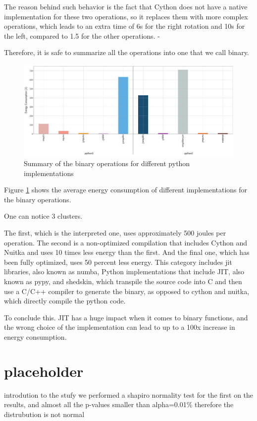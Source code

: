 The reason behind such behavior is the fact that Cython does not have a native implementation for these two operations, so it replaces them with more complex operations, which leads to an extra time of 6s for the right rotation and 10s for the left, compared to 1.5 for the other operations. -

Therefore, it is safe to summarize all the operations into one that we call binary.

\begin{figure}
    \centering
    \includegraphics[width=\linewidth]{imgs/bitopts_mean}
    \caption{Summary of the binary operations for different python implementations }
    \label{figure:bitops}
\end{figure}
Figure \ref{figure:bitops}  shows the average energy consumption of different implementations for the binary operations.

One can notice 3 clusters.

The first, which is the interpreted one, uses approximately 500 joules per operation. The second is a non-optimized compilation that includes Cython and Nuitka and uses 10 times less energy than the first. And the final one, which has been fully optimized, uses 50 percent less energy. This category includes jit libraries, also known as numba, Python implementations that include JIT, also known as pypy, and shedskin, which transpile the source code into C and then use a C/C++ compiler to generate the binary, as opposed to cython and nuitka, which directly compile the python code.




To conclude this. JIT has a huge impact when it comes to binary functions, and the wrong choice of the implementation can lead to up to a 100x increase in energy consumption.

\section{placeholder}
introdution to the stufy
we performed a shapiro normality test for the first on the results, and almost all the p-values smaller than alpha=0.01\% therefore the distrubution is not normal

